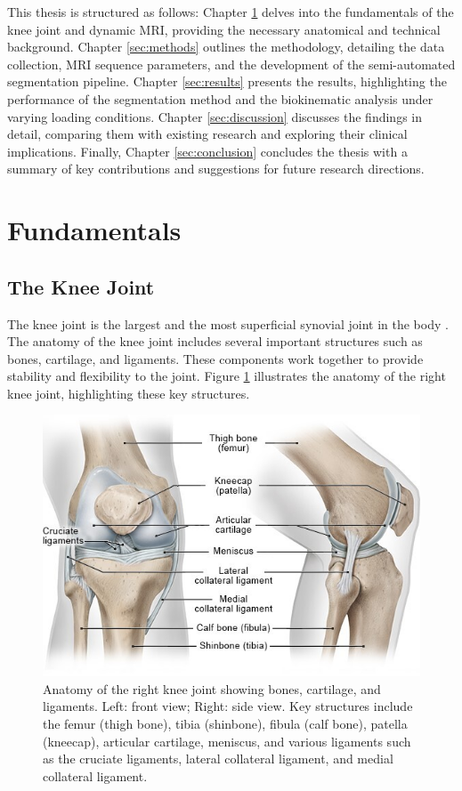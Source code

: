 \documentclass{micro-econ-thesis}
\begin{document}
This thesis is structured as follows: Chapter \ref{sec:fundamentals} delves into the fundamentals of the knee joint and dynamic MRI, providing the necessary anatomical and technical background. Chapter \ref{sec:methods} outlines the methodology, detailing the data collection, MRI sequence parameters, and the development of the semi-automated segmentation pipeline.  Chapter \ref{sec:results} presents the results, highlighting the performance of the segmentation method and the biokinematic analysis under varying loading conditions. Chapter \ref{sec:discussion} discusses the findings in detail, comparing them with existing research and exploring their clinical implications.
Finally, Chapter \ref{sec:conclusion} concludes the thesis with a summary of key contributions and suggestions for future research directions.

\section{Fundamentals}
\label{sec:fundamentals}


\subsection{The Knee Joint }

The knee joint is the largest and the most superficial synovial joint in the body \parencite{dalley_moores_2023}. The anatomy of the knee joint includes several important structures such as bones, cartilage, and ligaments. These components work together to provide stability and flexibility to the joint. Figure \ref{fig:kniearthrosekniegelenk-anatomieenjpg} illustrates the anatomy of the right knee joint, highlighting these key structures.
\begin{figure}[H]
	\centering
	\includegraphics[width=0.7\linewidth]{kniearthrose_kniegelenk-anatomie_enjpg}
	\caption{Anatomy of the right knee joint showing bones, cartilage, and ligaments. Left: front view; Right: side view. Key structures include the femur (thigh bone), tibia (shinbone), fibula (calf bone), patella (kneecap), articular cartilage, meniscus, and various ligaments such as the cruciate ligaments, lateral collateral ligament, and medial collateral ligament. \parencite{informedhealth2021}}
	\label{fig:kniearthrosekniegelenk-anatomieenjpg}
\end{figure}
\end{document}

